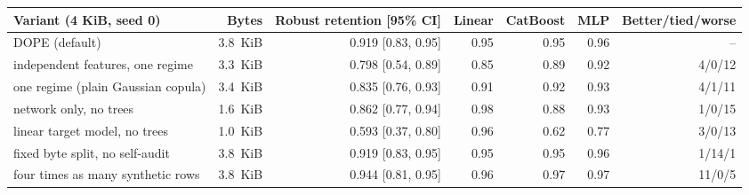 \begin{tabular}{lrrrrrr}
\toprule
Variant (4 KiB, seed 0) & Bytes & Robust retention [95\% CI] & Linear & CatBoost & MLP & Better/tied/worse \\
\midrule
DOPE (default) & 3.8~KiB & 0.919 [0.83, 0.95] & 0.95 & 0.95 & 0.96 & -- \\
independent features, one regime & 3.3~KiB & 0.798 [0.54, 0.89] & 0.85 & 0.89 & 0.92 & 4/0/12 \\
one regime (plain Gaussian copula) & 3.4~KiB & 0.835 [0.76, 0.93] & 0.91 & 0.92 & 0.93 & 4/1/11 \\
network only, no trees & 1.6~KiB & 0.862 [0.77, 0.94] & 0.98 & 0.88 & 0.93 & 1/0/15 \\
linear target model, no trees & 1.0~KiB & 0.593 [0.37, 0.80] & 0.96 & 0.62 & 0.77 & 3/0/13 \\
fixed byte split, no self-audit & 3.8~KiB & 0.919 [0.83, 0.95] & 0.95 & 0.95 & 0.96 & 1/14/1 \\
four times as many synthetic rows & 3.8~KiB & 0.944 [0.81, 0.95] & 0.96 & 0.97 & 0.97 & 11/0/5 \\
\bottomrule
\end{tabular}
